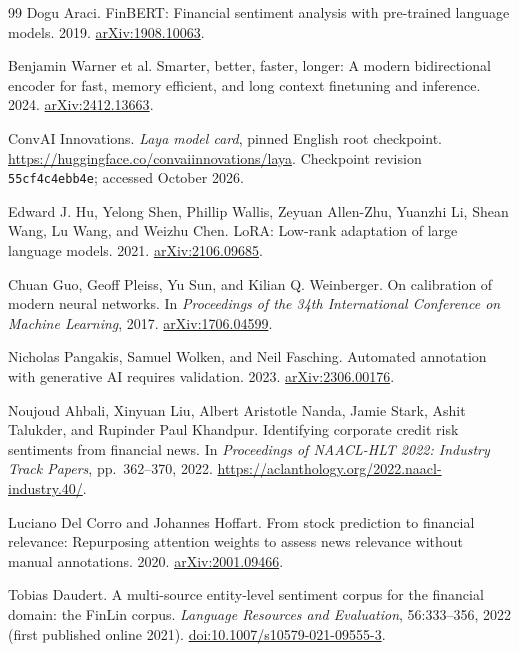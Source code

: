 \begin{thebibliography}{99}
\small
{}
Dogu Araci.
FinBERT: Financial sentiment analysis with pre-trained language models.
2019. \href{https://arxiv.org/abs/1908.10063}{arXiv:1908.10063}.

Benjamin Warner et al.
Smarter, better, faster, longer: A modern bidirectional encoder for fast,
memory efficient, and long context finetuning and inference.
2024. \href{https://arxiv.org/abs/2412.13663}{arXiv:2412.13663}.

ConvAI Innovations.
\emph{Laya model card}, pinned English root checkpoint.
\url{https://huggingface.co/convaiinnovations/laya}.
Checkpoint revision \texttt{55cf4c4ebb4e}; accessed October 2026.

Edward J. Hu, Yelong Shen, Phillip Wallis, Zeyuan Allen-Zhu, Yuanzhi Li,
Shean Wang, Lu Wang, and Weizhu Chen.
LoRA: Low-rank adaptation of large language models.
2021. \href{https://arxiv.org/abs/2106.09685}{arXiv:2106.09685}.

Chuan Guo, Geoff Pleiss, Yu Sun, and Kilian Q. Weinberger.
On calibration of modern neural networks.
In \emph{Proceedings of the 34th International Conference on Machine Learning},
2017. \href{https://arxiv.org/abs/1706.04599}{arXiv:1706.04599}.

Nicholas Pangakis, Samuel Wolken, and Neil Fasching.
Automated annotation with generative AI requires validation.
2023. \href{https://arxiv.org/abs/2306.00176}{arXiv:2306.00176}.

Noujoud Ahbali, Xinyuan Liu, Albert Aristotle Nanda, Jamie Stark, Ashit Talukder,
and Rupinder Paul Khandpur.
Identifying corporate credit risk sentiments from financial news.
In \emph{Proceedings of NAACL-HLT 2022: Industry Track Papers},
pp.\ 362--370, 2022. \url{https://aclanthology.org/2022.naacl-industry.40/}.

Luciano Del Corro and Johannes Hoffart.
From stock prediction to financial relevance: Repurposing attention weights
to assess news relevance without manual annotations.
2020. \href{https://arxiv.org/abs/2001.09466}{arXiv:2001.09466}.

Tobias Daudert.
A multi-source entity-level sentiment corpus for the financial domain:
the FinLin corpus.
\emph{Language Resources and Evaluation}, 56:333--356, 2022
(first published online 2021).
\href{https://doi.org/10.1007/s10579-021-09555-3}{doi:10.1007/s10579-021-09555-3}.


\end{thebibliography}
